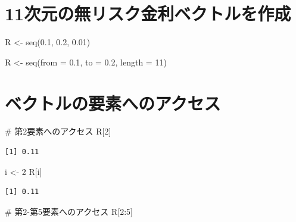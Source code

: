 \documentclass[
  letterpaper,
  DIV=11,
  numbers=noendperiod]{scrreprt}
\newenvironment{Shaded}{\begin{snugshade}}{\end{snugshade}}
\newcommand{\AttributeTok}[1]{\textcolor[rgb]{0.40,0.45,0.13}{#1}}
\newcommand{\CommentTok}[1]{\textcolor[rgb]{0.37,0.37,0.37}{#1}}
\newcommand{\DecValTok}[1]{\textcolor[rgb]{0.68,0.00,0.00}{#1}}
\newcommand{\FloatTok}[1]{\textcolor[rgb]{0.68,0.00,0.00}{#1}}
\newcommand{\FunctionTok}[1]{\textcolor[rgb]{0.28,0.35,0.67}{#1}}
\newcommand{\NormalTok}[1]{\textcolor[rgb]{0.00,0.23,0.31}{#1}}
\newcommand{\OtherTok}[1]{\textcolor[rgb]{0.00,0.23,0.31}{#1}}
\newcommand{\SpecialCharTok}[1]{\textcolor[rgb]{0.37,0.37,0.37}{#1}}
\begin{document}
\section{11次元の無リスク金利ベクトルを作成}\label{ux6b21ux5143ux306eux7121ux30eaux30b9ux30afux91d1ux5229ux30d9ux30afux30c8ux30ebux3092ux4f5cux6210-1}

\begin{Shaded}
\begin{Highlighting}[]
\NormalTok{R }\OtherTok{\textless{}{-}} \FunctionTok{seq}\NormalTok{(}\FloatTok{0.1}\NormalTok{, }\FloatTok{0.2}\NormalTok{, }\FloatTok{0.01}\NormalTok{)}

\NormalTok{R }\OtherTok{\textless{}{-}} \FunctionTok{seq}\NormalTok{(}\AttributeTok{from =} \FloatTok{0.1}\NormalTok{, }\AttributeTok{to =} \FloatTok{0.2}\NormalTok{, }\AttributeTok{length =} \DecValTok{11}\NormalTok{)}
\end{Highlighting}
\end{Shaded}

\section{ベクトルの要素へのアクセス}\label{ux30d9ux30afux30c8ux30ebux306eux8981ux7d20ux3078ux306eux30a2ux30afux30bbux30b9}

\begin{Shaded}
\begin{Highlighting}[]
\CommentTok{\# 第2要素へのアクセス}
\NormalTok{R[}\DecValTok{2}\NormalTok{] }
\end{Highlighting}
\end{Shaded}

\begin{verbatim}
[1] 0.11
\end{verbatim}

\begin{Shaded}
\begin{Highlighting}[]
\NormalTok{i }\OtherTok{\textless{}{-}} \DecValTok{2}
\NormalTok{R[i]}
\end{Highlighting}
\end{Shaded}

\begin{verbatim}
[1] 0.11
\end{verbatim}

\begin{Shaded}
\begin{Highlighting}[]
\CommentTok{\# 第2{-}第5要素へのアクセス}
\NormalTok{R[}\DecValTok{2}\SpecialCharTok{:}\DecValTok{5}\NormalTok{]}
\end{Highlighting}
\end{Shaded}
\end{document}
